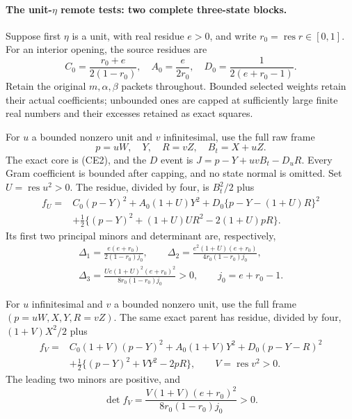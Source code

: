 \paragraph{The unit-$\eta$ remote tests: two complete three-state blocks.}
Suppose first $\eta$ is a unit, with real residue $e>0$, and write
$r_0=\operatorname{res}r\in[0,1]$. For an interior opening,
the source residues are
\[
 C_0=\frac{r_0+e}{2(1-r_0)},\quad
 A_0=\frac e{2r_0},\quad D_0=\frac1{2(e+r_0-1)}.       \tag{SB5}
\]
Retain the original $m,\alpha,\beta$ packets throughout. Bounded
selected weights retain their actual coefficients; unbounded ones
are capped at sufficiently large finite real numbers and their
excesses retained as exact squares.

For $u$ a bounded nonzero unit and $v$ infinitesimal, use the full
raw frame
\[
 p=uW,\quad Y,\quad R=vZ,\quad B_t=X+uZ.
\]
The exact core is (CE2), and the $D$ event is
$J=p-Y+uvB_t-D_uR$. Every Gram coefficient is bounded after
capping, and no state normal is omitted. Set $U=\operatorname{res}u^2>0$.
The residue, divided by four, is $B_t^2/2$ plus
\[
\begin{split}
 f_U={}&C_0(p-Y)^2+A_0(1+U)Y^2
       +D_0\{p-Y-(1+U)R\}^2\\
 &+\tfrac12\{(p-Y)^2+(1+U)UR^2-2(1+U)pR\}.
\end{split}                                            \tag{SB6}
\]
Its first two principal minors and determinant are, respectively,
\[
\begin{gathered}
\Delta_1=\frac{e(e+r_0)}{2(1-r_0)j_0},\qquad
\Delta_2=\frac{e^2(1+U)(e+r_0)}{4r_0(1-r_0)j_0},\\
\Delta_3=\frac{Ue(1+U)^2(e+r_0)^2}{8r_0(1-r_0)j_0}>0,
\qquad j_0=e+r_0-1.
\end{gathered}                                      \tag{SB7}
\]

For $u$ infinitesimal and $v$ a bounded nonzero unit, use the full
frame $(p=uW,X,Y,R=vZ)$. The same exact parent has residue,
divided by four, $(1+V)X^2/2$ plus
\[
\begin{split}
 f_V={}&C_0(1+V)(p-Y)^2+A_0(1+V)Y^2
       +D_0(p-Y-R)^2\\
       &+\tfrac12\{(p-Y)^2+VY^2-2pR\},
 \qquad V=\operatorname{res}v^2>0.
\end{split}                                            \tag{SB8}
\]
The leading two minors are positive, and
\[
 \det f_V=\frac{V(1+V)(e+r_0)^2}{8r_0(1-r_0)j_0}>0. \tag{SB9}
\]

